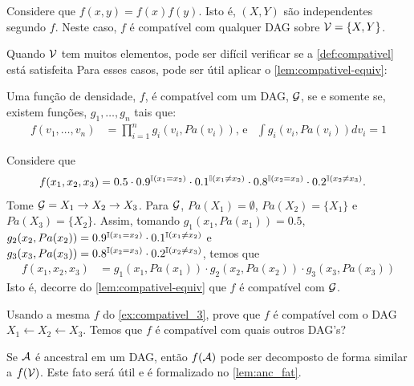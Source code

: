 \begin{example}
 \label{ex:compativel_2}
 Considere que $f(x,y) = f(x)f(y)$.
 Isto é, $(X,Y)$ são independentes segundo $f$.
 Neste caso, $f$ é compatível com qualquer DAG 
 sobre ${\mathcal V} = \{X,Y\}$.
\end{example}

Quando ${\mathcal V}$ tem muitos elementos, 
pode ser difícil verificar 
se a \cref{def:compativel} está satisfeita 
Para esses casos,
pode ser útil aplicar o 
\cref{lem:compativel-equiv}:

\begin{lemma}
 \label{lem:compativel-equiv}
 Uma função de densidade, $f$, é
 compatível com um DAG, ${\mathcal G}$,
 se e somente se, existem funções,
 $g_1,\ldots,g_n$ tais que:
 \begin{align*}
  f(v_1,\ldots,v_n)
  &= \prod_{i=1}^n g_i(v_i, Pa(v_i)) \text{, e}
  & \int g_i(v_i, Pa(v_i)) dv_i = 1
 \end{align*}
\end{lemma}

\begin{example}
 \label{ex:compativel_3}
 Considere que 
 \begin{align*}
  f(x_1,x_2,x_3) &= 0.5 \cdot 0.9^{{\mathbb I}(x_1 = x_2)} \cdot 0.1^{{\mathbb I}(x_1 \neq x_2)} 
  \cdot 0.8^{{\mathbb I}(x_2 = x_3)} \cdot 0.2^{{\mathbb I}(x_2 \neq x_3)}.
 \end{align*}
 Tome ${\mathcal G} = X_1 \rightarrow X_2 \rightarrow X_3$. Para ${\mathcal G}$,
 $Pa(X_1) = \emptyset$, $Pa(X_2) = \{X_1\}$ e $Pa(X_3) = \{X_2\}$.
 Assim, tomando $g_1(x_1, Pa(x_1)) = 0.5$,
 $g_2(x_2, Pa(x_2)) = 0.9^{{\mathbb I}(x_1 = x_2)} \cdot 0.1^{{\mathbb I}(x_1 \neq x_2)}$ e
 $g_3(x_3, Pa(x_3)) = 0.8^{{\mathbb I}(x_2 = x_3)} \cdot 0.2^{{\mathbb I}(x_2 \neq x_3)}$,
 temos que
 \begin{align*}
  f(x_1,x_2,x_3)
  &= g_1(x_1, Pa(x_1)) \cdot g_2(x_2, Pa(x_2)) \cdot g_3(x_3, Pa(x_3))
 \end{align*}
 Isto é, decorre do \cref{lem:compativel-equiv} que
 $f$ é compatível com ${\mathcal G}$.
\end{example}

\begin{exercise}
 Usando a mesma $f$ do \cref{ex:compativel_3},
 prove que $f$ é compatível com o DAG
 $X_1 \leftarrow X_2 \leftarrow X_3$.
 Temos que $f$ é compatível com quais outros DAG's?
\end{exercise}

Se ${\mathcal A}$ é ancestral em um DAG, então
$f({\mathcal A})$ pode ser decomposto de forma similar a $f({\mathcal V})$.
Este fato será útil e é
formalizado no \cref{lem:anc_fat}.


